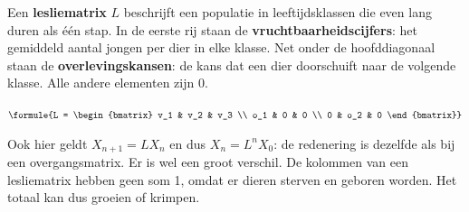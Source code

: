 \begin{theorie}
Een \textbf{\textcolor{accent}{lesliematrix}} $L$ beschrijft een populatie in leeftijdsklassen die even lang duren als één stap. In de eerste rij staan de \textbf{\textcolor{accent}{vruchtbaarheidscijfers}}: het gemiddeld aantal jongen per dier in elke klasse. Net onder de hoofddiagonaal staan de \textbf{\textcolor{accent}{overlevingskansen}}: de kans dat een dier doorschuift naar de volgende klasse. Alle andere elementen zijn 0.

\vspace{1mm}
\qquad $\formule{L = \begin{bmatrix} v_1 & v_2 & v_3 \\ o_1 & 0 & 0 \\ 0 & o_2 & 0 \end{bmatrix}}$
\end{theorie}

Ook hier geldt $X_{n+1} = L X_n$ en dus $X_n = L^n X_0$: de redenering is dezelfde als bij een overgangsmatrix. Er is wel een groot verschil. De kolommen van een lesliematrix hebben geen som 1, omdat er dieren sterven en geboren worden. Het totaal kan dus groeien of krimpen.

